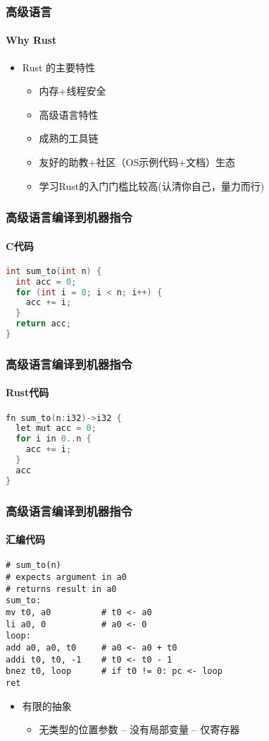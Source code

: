 \begin{frame}
	\frametitle{高级语言}
	\framesubtitle{Why Rust}
	
	\begin{itemize}
		
		\item Rust 的主要特性
		\begin{itemize}
			\item 内存+线程安全
			\item 高级语言特性
			\item 成熟的工具链
			\item 友好的助教+社区（OS示例代码+文档）生态
			\item 学习Rust的入门门槛比较高(认清你自己，量力而行)
		\end{itemize}
		
	\end{itemize}	
	
\end{frame}





\begin{frame}[fragile]
	\frametitle{高级语言编译到机器指令}
	\framesubtitle{C代码}

\small	
\begin{lstlisting}[language = C]
int sum_to(int n) {
  int acc = 0;
  for (int i = 0; i < n; i++) {
    acc += i;
  }
  return acc;
}
\end{lstlisting}
	
\end{frame}


\begin{frame}[fragile]
	\frametitle{高级语言编译到机器指令}
	\framesubtitle{Rust代码}
	
\small	
\begin{lstlisting}[language = C]
fn sum_to(n:i32)->i32 {
  let mut acc = 0;
  for i in 0..n {
    acc += i;
  }
  acc
}
\end{lstlisting}
	
\end{frame}

\begin{frame}
\frametitle{高级语言编译到机器指令}
\framesubtitle{汇编代码}

\small	
\begin{lstlisting}
# sum_to(n)
# expects argument in a0
# returns result in a0
sum_to:
mv t0, a0          # t0 <- a0
li a0, 0           # a0 <- 0
loop:
add a0, a0, t0     # a0 <- a0 + t0
addi t0, t0, -1    # t0 <- t0 - 1
bnez t0, loop      # if t0 != 0: pc <- loop
ret
\end{lstlisting}	

\begin{itemize}
	
	\item 有限的抽象
	\begin{itemize}
	  \item 无类型的位置参数 -- 没有局部变量 -- 仅寄存器
	\end{itemize}
		
\end{itemize}
	
\end{frame}

